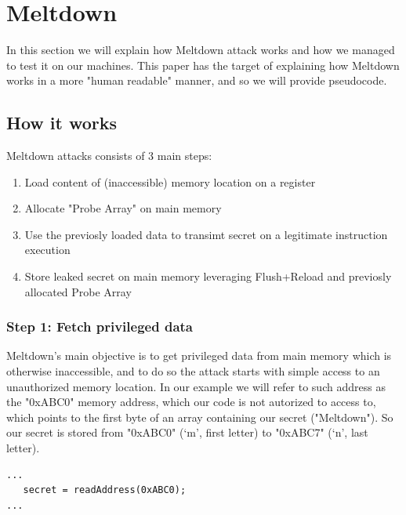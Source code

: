 \section{Meltdown}
In this section we will explain how Meltdown attack works and how we managed to
test it on our machines. This paper has the target of explaining how Meltdown works in a more "human readable" manner, and so we will provide pseudocode.

\subsection{How it works}
Meltdown attacks consists of 3 main steps:

\begin{enumerate}[label={Step \arabic*:}]
    \item Load content of (inaccessible) memory location on a register
    \item Allocate "Probe Array" on main memory
    \item Use the previosly loaded data to transimt secret on a legitimate instruction execution
    \item Store leaked secret on main memory leveraging Flush+Reload and previosly allocated Probe Array
\end{enumerate}


\subsubsection{Step 1: Fetch privileged data}
Meltdown's main objective is to get privileged data from main memory which is otherwise inaccessible, and to do so
the attack starts with simple access to an unauthorized memory location.
In our example we will refer to such address as the "0xABC0" memory address, which our code is not autorized to access to,
which points to the first byte of an array containing our secret ("Meltdown").
So our secret is stored from "0xABC0" (`m', first letter) to "0xABC7" (`n', last letter).

\begin{verbatim}
...
   secret = readAddress(0xABC0);
...
\end{verbatim}

